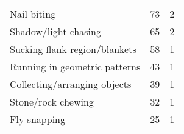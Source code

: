 \documentclass[varwidth=\maxdimen]{standalone}
\newcommand{\subrow}[1]{\hspace{1.25em}#1}
\begin{document}
\begin{tabular}[t]{lrr}
  \subrow{Nail biting}                         &       73 &               2 \\
  \subrow{Shadow/light chasing}                &       65 &               2 \\
  \subrow{Sucking flank region/blankets}       &       58 &               1 \\
  \subrow{Running in geometric patterns}       &       43 &               1 \\
  \subrow{Collecting/arranging objects}        &       39 &               1 \\
  \subrow{Stone/rock chewing}                  &       32 &               1 \\
  \subrow{Fly snapping}                        &       25 &               1 \\
\bottomrule
\end{tabular}
\end{document}

